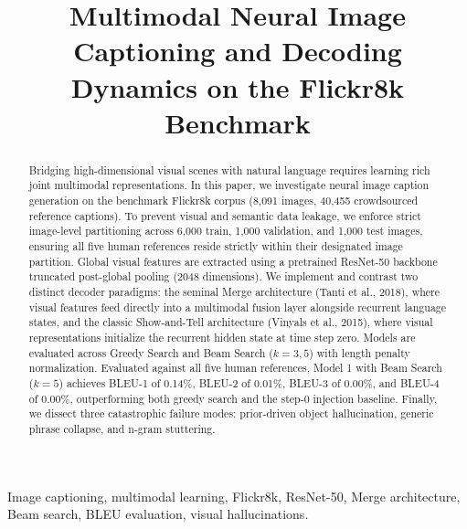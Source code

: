 \documentclass[conference]{IEEEtran}
\begin{document}
\title{Multimodal Neural Image Captioning and Decoding Dynamics on the Flickr8k Benchmark}

\author{
}

\maketitle

\begin{abstract}
Bridging high-dimensional visual scenes with natural language requires learning rich joint multimodal representations. In this paper, we investigate neural image caption generation on the benchmark Flickr8k corpus (8,091 images, 40,455 crowdsourced reference captions). To prevent visual and semantic data leakage, we enforce strict image-level partitioning across 6,000 train, 1,000 validation, and 1,000 test images, ensuring all five human references reside strictly within their designated image partition. Global visual features are extracted using a pretrained ResNet-50 backbone truncated post-global pooling (2048 dimensions). We implement and contrast two distinct decoder paradigms: the seminal Merge architecture (Tanti et al., 2018), where visual features feed directly into a multimodal fusion layer alongside recurrent language states, and the classic Show-and-Tell architecture (Vinyals et al., 2015), where visual representations initialize the recurrent hidden state at time step zero. Models are evaluated across Greedy Search and Beam Search ($k=3, 5$) with length penalty normalization. Evaluated against all five human references, Model 1 with Beam Search ($k=5$) achieves BLEU-1 of 0.14\%, BLEU-2 of 0.01\%, BLEU-3 of 0.00\%, and BLEU-4 of 0.00\%, outperforming both greedy search and the step-0 injection baseline. Finally, we dissect three catastrophic failure modes: prior-driven object hallucination, generic phrase collapse, and n-gram stuttering.
\end{abstract}

\begin{IEEEkeywords}
Image captioning, multimodal learning, Flickr8k, ResNet-50, Merge architecture, Beam search, BLEU evaluation, visual hallucinations.
\end{IEEEkeywords}
\end{document}
